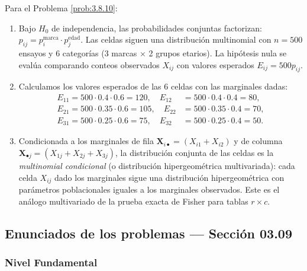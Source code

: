 \begin{solucion}
	\label{sol:3.8.10}
	Para el Problema \ref{prob:3.8.10}:
	\begin{enumerate}
		\item Bajo $H_{0}$ de independencia, las probabilidades conjuntas factorizan: $p_{ij} = p_{i}^{\text{marca}} \cdot p_{j}^{\text{edad}}$. Las celdas siguen una distribución multinomial con $n = 500$ ensayos y $6$ categorías (3 marcas $\times$ 2 grupos etarios). La hipótesis nula se evalúa comparando conteos observados $X_{ij}$ con valores esperados $E_{ij} = 500 p_{ij}$.
		\item Calculamos los valores esperados de las 6 celdas con las marginales dadas:
		\begin{align*}
			E_{11} = 500 \cdot 0.4 \cdot 0.6 = 120, \quad E_{12} &= 500 \cdot 0.4 \cdot 0.4 = 80, \\
			E_{21} = 500 \cdot 0.35 \cdot 0.6 = 105, \quad E_{22} &= 500 \cdot 0.35 \cdot 0.4 = 70, \\
			E_{31} = 500 \cdot 0.25 \cdot 0.6 = 75, \quad E_{32} &= 500 \cdot 0.25 \cdot 0.4 = 50.
		\end{align*}
		\item Condicionada a los marginales de fila $\bm{X}_{i \bullet} = (X_{i1} + X_{i2})$ y de columna $\bm{X}_{\bullet j} = (X_{1j} + X_{2j} + X_{3j})$, la distribución conjunta de las celdas es la \emph{multinomial condicional} (o distribución hipergeométrica multivariada): cada celda $X_{ij}$ dado los marginales sigue una distribución hipergeométrica con parámetros poblacionales iguales a los marginales observados. Este es el análogo multivariado de la prueba exacta de Fisher para tablas $r \times c$. \qedhere
	\end{enumerate}
\end{solucion}


\subsection*{Enunciados de los problemas --- Sección 03.09}

\subsubsection*{Nivel Fundamental}

